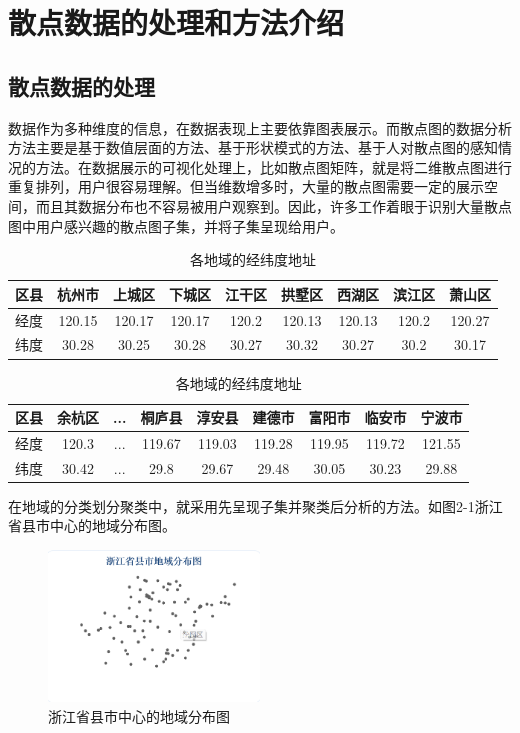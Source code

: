 \clearpage
\section{散点数据的处理和方法介绍}
\subsection{散点数据的处理}
\par 数据作为多种维度的信息，在数据表现上主要依靠图表展示。而散点图的数据分析方法主要是基于数值层面的方法、基于形状模式的方法、基于人对散点图的感知情况的方法。在数据展示的可视化处理上，比如散点图矩阵，就是将二维散点图进行重复排列，用户很容易理解。但当维数增多时，大量的散点图需要一定的展示空间，而且其数据分布也不容易被用户观察到。因此，许多工作着眼于识别大量散点图中用户感兴趣的散点图子集，并将子集呈现给用户。
\begin{table}[!ht]
    \centering
        \caption{各地域的经纬度地址}
    \begin{tabular}{ccccccccc}
    \hline
       区县  &  杭州市 &	上城区	& 下城区 &	江干区 & 拱墅区 & 西湖区	& 滨江区	& 萧山区\\ \hline
       经度  &  120.15 &	120.17	& 120.17 &	120.2 & 120.13 & 120.13	& 120.2	& 120.27 \\ 
       纬度  & 30.28  &	30.25	& 30.28 &	30.27 & 30.32 & 30.27	& 30.2	& 30.17 \\ \hline
    \end{tabular}
    \label{tab:my_label}
\end{table}

\begin{table}[!ht]
    \centering
     \caption{各地域的经纬度地址}
    \begin{tabular}{ccccccccc}
    \hline
       区县  &  余杭区 &	...	& 桐庐县 &	淳安县 & 建德市 & 富阳市	& 临安市	& 宁波市\\ \hline
       经度  &  120.3 &	...	& 119.67 &	119.03 & 119.28 & 119.95	& 119.72	& 121.55 \\ 
       纬度  & 30.42  &	...	& 29.8 &	29.67 & 29.48 & 30.05	& 30.23	& 29.88 \\ \hline
    \end{tabular}
    \label{tab:my_label}
\end{table}

\par 在地域的分类划分聚类中，就采用先呈现子集并聚类后分析的方法。如图2-1浙江省县市中心的地域分布图。

\begin{figure}[!ht]
    \centering
     \includegraphics[width=0.5\textwidth]{fig2/fig21.png}
      \caption{浙江省县市中心的地域分布图}
\end{figure}
\FloatBarrier  %

